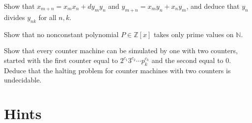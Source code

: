 \begin{exercise}[$\star\star$]\label{ex:pelladd}
Show that $x_{m+n}=x_mx_n+dy_my_n$ and $y_{m+n}=x_my_n+x_ny_m$, and deduce that $y_n$ divides $y_{nk}$ for all $n,k$.
\end{exercise}

\begin{exercise}[$\star$]\label{ex:primepoly}
Show that no nonconstant polynomial $P\in\mathbb Z[x]$ takes only prime values on $\mathbb N$.
\end{exercise}

\begin{exercise}[$\star\star\star$]\label{ex:twocounters}
Show that every counter machine can be simulated by one with two counters, started with the first counter equal to $2^{c_1}3^{c_2}\cdots p_k^{c_k}$ and the second equal to $0$. Deduce that the halting problem for counter machines with two counters is undecidable.
\end{exercise}

\section{Hints}

